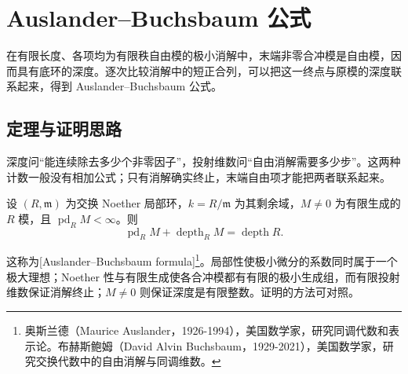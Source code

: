 
\section{Auslander–Buchsbaum 公式}
\label{b3:sec:1703}

在有限长度、各项均为有限秩自由模的极小消解中，末端非零合冲模是自由模，因而具有底环的深度。逐次比较消解中的短正合列，可以把这一终点与原模的深度联系起来，得到 Auslander–Buchsbaum 公式。

%
%

\subsection{定理与证明思路}
\label{b3:subsec:1703:01}
\label{b3:subsec:1703:02}

深度问“能连续除去多少个非零因子”，投射维数问“自由消解需要多少步”。这两种计数一般没有相加公式；只有消解确实终止，末端自由项才能把两者联系起来。

\begin{theorem}\label{b3:thm:auslander-buchsbaum}
	设 \((R,\mathfrak m)\) 为交换 Noether 局部环，\(k=R/\mathfrak m\) 为其剩余域，\(M\ne0\) 为有限生成的 \(R\) 模，且 \(\operatorname{pd}_RM<\infty\)。则
	\begin{equation}\label{b3:eq:auslander-buchsbaum}
		\operatorname{pd}_RM+\operatorname{depth}_RM=\operatorname{depth}R.
	\end{equation}
\end{theorem}

这称为[Auslander--Buchsbaum formula]\footnote{奥斯兰德（Maurice Auslander，1926-1994），美国数学家，研究同调代数和表示论。布赫斯鲍姆（David Alvin Buchsbaum，1929-2021），美国数学家，研究交换代数中的自由消解与同调维数。}。局部性使极小微分的系数同时属于一个极大理想；Noether 性与有限生成使各合冲模都有有限的极小生成组，而有限投射维数保证消解终止；\(M\ne0\) 则保证深度是有限整数。证明的方法可对照\cite[Theorem 19.1, p. 155]{Matsumura1989CommutativeRingTheory}。

